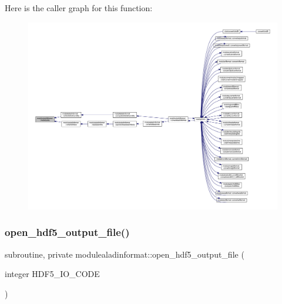 Here is the caller graph for this function\+:\nopagebreak
\begin{figure}[H]
\begin{center}
\leavevmode
\includegraphics[width=350pt]{namespacemodulealadinformat_a0e28e132a765a53e91eb16cf638b0b32_icgraph}
\end{center}
\end{figure}
\mbox{\label{namespacemodulealadinformat_a554b3cf12b5ecedce22b2e607f931c70}} 
\subsubsection{\texorpdfstring{open\+\_\+hdf5\+\_\+output\+\_\+file()}{open\_hdf5\_output\_file()}}
{\footnotesize\ttfamily subroutine, private modulealadinformat\+::open\+\_\+hdf5\+\_\+output\+\_\+file (\begin{DoxyParamCaption}\item[{integer}]{H\+D\+F5\+\_\+\+I\+O\+\_\+\+C\+O\+DE }\end{DoxyParamCaption})\hspace{0.3cm}{\ttfamily [private]}}


